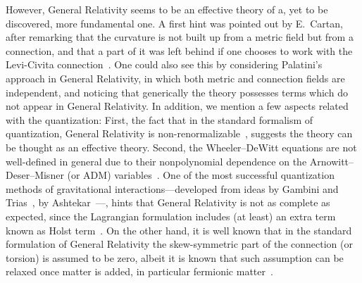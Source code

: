 \documentclass[aps,prd,12pt,twocolumn,superscriptaddress,showpacs,showkeys,reprint%
]{revtex4-1}
\renewcommand{\(}{\left(}
\renewcommand{\)}{\right)}
\renewcommand{\[}{\left[}
\renewcommand{\]}{\right]}
\begin{document}
However, General Relativity seems to be an effective theory of a, yet to be discovered, more fundamental one. A first hint was pointed out by E.~Cartan, after remarking that the curvature is not built up from a metric field but from a connection, and that a part of it was left behind if one chooses to work with the Levi-Civita connection~\cite{Cartan1922,Cartan1923,Cartan1924,Cartan1925}. One could also see this by considering Palatini's approach in General Relativity, in which both metric and connection fields are independent, and noticing that generically the theory possesses terms which do not appear in General Relativity. In addition, we mention a few aspects related with the quantization: First, the fact that in the standard formalism of quantization, General Relativity is non-renormalizable~\cite{'tHooft:1973us,'tHooft:1974bx,Deser:1974cz,Deser:1974cy}, suggests the theory can be thought as an effective theory. Second, the Wheeler--DeWitt equations are not well-defined in general due to their nonpolynomial dependence on the Arnowitt--Deser--Misner (or ADM) variables~\cite{Arnowitt:1959ah,Arnowitt:1960es,WheelerGeo,DeWitt:1967yk,DeWitt:1967ub,DeWitt:1967uc}. One of the most successful quantization methods of gravitational interactions---developed from ideas by Gambini and Trias~\cite{Gambini:1980yz,Gambini:1986ew}, by Ashtekar~\cite{Ashtekar:1986yd,Ashtekar:1987gu}---, hints that General Relativity is not as complete as expected, since the Lagrangian formulation includes (at least) an extra term known as Holst term~\cite{Holst:1995pc}. On the other hand, it is well known that in the standard formulation of General Relativity the skew-symmetric part of the connection (or torsion) is assumed to be zero, albeit it is known that such assumption can be relaxed once matter is added, in particular fermionic matter~\cite{Kibble:1961ba,Hehl:1976kj,Shapiro:2001rz,Hammond:2002rm}.
\end{document}
